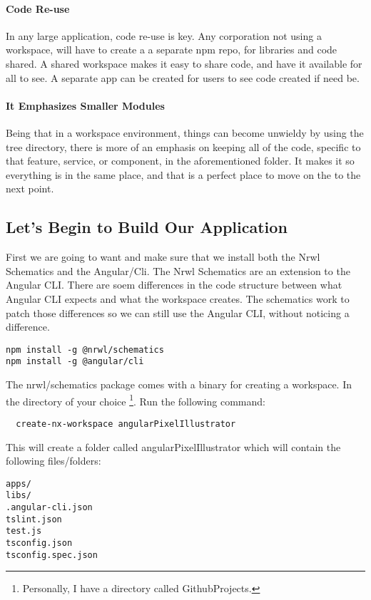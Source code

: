 \paragraph{Code Re-use}
In any large application, code re-use is key. Any corporation not using a
workspace, will have to create a a separate npm repo, for libraries and code
shared. A shared workspace makes it easy to share code, and have it available
for all to see. A separate app can be created for users to see code created if
need be.

\paragraph{It Emphasizes Smaller Modules}
Being that in a workspace environment, things can become unwieldy by using the
tree directory, there is more of an emphasis on keeping all of the code,
specific to that feature, service, or component, in the aforementioned folder.
It makes it so everything is in the same place, and that is a perfect place to
move on the to the next point.

\subsection{Let's Begin to Build Our Application}

First we are going to want and make sure that we install both the Nrwl Schematics
and the Angular/Cli. The Nrwl Schematics are an extension to the Angular CLI.
There are soem differences in the code structure between what Angular CLI expects
and what the workspace creates. The schematics work to patch those differences
so we can still use the Angular CLI, without noticing a difference.

\begin{verbatim}
npm install -g @nrwl/schematics
npm install -g @angular/cli
\end{verbatim}

The nrwl/schematics package comes with a binary for creating a workspace. In the
directory of your choice \footnote{Personally, I have a directory called
GithubProjects.}. Run the following command:
\begin{verbatim}
  create-nx-workspace angularPixelIllustrator
\end{verbatim}

This will create a folder called angularPixelIllustrator which will contain the
following files/folders:
\begin{verbatim}
apps/
libs/
.angular-cli.json
tslint.json
test.js
tsconfig.json
tsconfig.spec.json
\end{verbatim}

